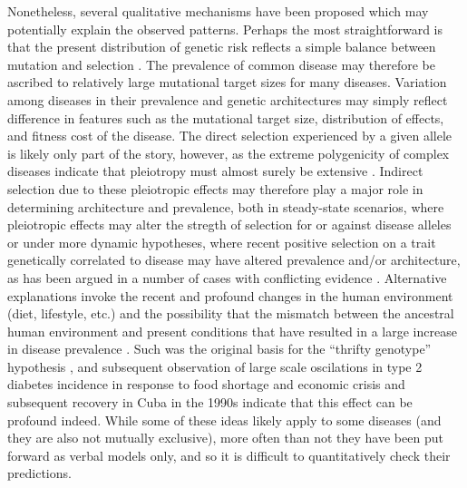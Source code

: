 \documentclass[11pt]{article}
\begin{document}
Nonetheless, several qualitative mechanisms have been proposed which may potentially explain the observed patterns. Perhaps the most straightforward is that the present distribution of genetic risk reflects a simple balance between mutation and selection \cite{Johnson:2005do}. The prevalence of common disease may therefore be ascribed to relatively large mutational target sizes for many diseases. Variation among diseases in their prevalence and genetic architectures may simply reflect difference in features such as the mutational target size, distribution of effects, and fitness cost of the disease. The direct selection experienced by a given allele is likely only part of the story, however, as the extreme polygenicity of complex diseases indicate that pleiotropy must almost surely be extensive \cite{Pickrell:2016ko, Visscher:2016fp}. Indirect selection due to these pleiotropic effects may therefore play a major role in determining architecture and prevalence, both in steady-state scenarios, where pleiotropic effects may alter the stregth of selection for or against disease alleles or under more dynamic hypotheses, where recent positive selection on a trait genetically correlated to disease may have altered prevalence and/or architecture, as has been argued in a number of cases with conflicting evidence \cite{Fraser:2013jj,Berg:2014bs, Corona:2013cl, Chen:2012jv, Ayub:2014hk,Polimanti:2017bv}. Alternative explanations invoke the recent and profound changes in the human environment (diet, lifestyle, etc.) and the possibility that the mismatch between the ancestral human environment and present conditions that have resulted in a large increase in disease prevalence \cite{Gibson:2000vi, Gibson:2009ie}. Such was the original basis for the ``thrifty genotype'' hypothesis \cite{Neel:1962tj, Neel:1999tu}, and subsequent observation of large scale oscilations in type 2 diabetes incidence in response to food shortage and economic crisis and subsequent recovery in Cuba in the 1990s \cite{Franco:2013hb} indicate that this effect can be profound indeed. While some of these ideas likely apply to some diseases (and they are also not mutually exclusive), more often than not they have been put forward as verbal models only, and so it is difficult to quantitatively check their predictions.
\end{document}
